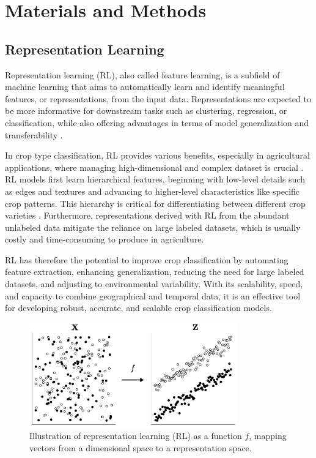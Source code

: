 \documentclass[journal,article,submit,pdftex,moreauthors]{Definitions/mdpi}
\begin{document}
\section{Materials and Methods}
\subsection{Representation Learning}
Representation learning (RL), also called feature learning, is a subfield of machine learning
that aims to automatically learn and identify meaningful features, or representations, from the input data. Representations are expected to be more informative for downstream tasks such as clustering, regression, or classification, while also offering advantages in terms of model generalization and transferability \cite{Tzelepi2022}.

In crop type classification, \ac{RL} provides various benefits, especially in agricultural applications, where managing high-dimensional and complex dataset is crucial \cite{Reichstein2019}. \ac{RL} models first learn hierarchical features, beginning with low-level details such as edges and textures and advancing to higher-level characteristics like specific crop patterns. This hierarchy is critical for differentiating between different crop varieties \cite{Kussul2017}. Furthermore, representations derived with \ac{RL} from the abundant unlabeled data mitigate the reliance on large labeled datasets, which is usually costly and time-consuming to produce in agriculture.

\ac{RL} has therefore the potential to improve crop classification by automating feature extraction, enhancing generalization, reducing the need for large labeled datasets, and adjusting to environmental variability. With its scalability, speed, and capacity to combine geographical and temporal data, it is an effective tool for developing robust, accurate, and scalable crop classification models.

\begin{figure}[H]
	\centering
	\includegraphics[width=9cm]{figures/representation_learning.pdf}
	 \caption{Illustration of representation learning (RL) as a function $f$, mapping vectors from a dimensional space to a representation space.}
	\label{}      
	\centering
\end{figure}
\end{document}
